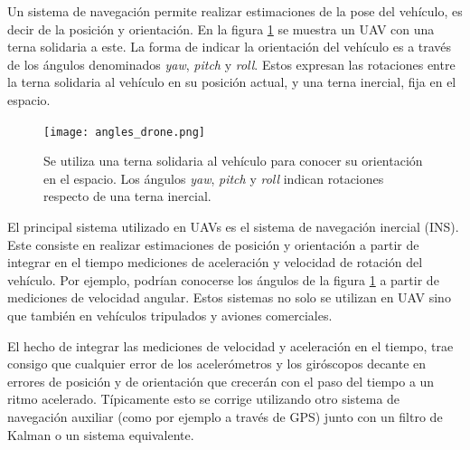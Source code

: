 
Un sistema de navegación permite realizar estimaciones de la pose del vehículo, es decir de la posición y orientación. En la figura \ref{fig:angles_drone} se muestra un UAV con una terna solidaria a este. La forma de indicar la orientación del vehículo es a través de los ángulos denominados \textit{yaw}, \textit{pitch} y \textit{roll}. Estos expresan las rotaciones entre la terna solidaria al vehículo en su posición actual, y una terna inercial, fija en el espacio.

\begin{figure}[H]
    \centering
    \texttt{[image: angles\_drone.png]}
    \caption{Se utiliza una terna solidaria al vehículo para conocer su orientación en el espacio. Los ángulos \textit{yaw}, \textit{pitch} y \textit{roll} indican rotaciones respecto de una terna inercial.}
    \label{fig:angles_drone}    
\end{figure}

El principal sistema utilizado en UAVs es el sistema de navegación inercial (INS). Este consiste en realizar estimaciones de posición y orientación a partir de integrar en el tiempo mediciones de aceleración y velocidad de rotación del vehículo. Por ejemplo, podrían conocerse los ángulos de la figura \ref{fig:angles_drone} a partir de mediciones de velocidad angular. Estos sistemas no solo se utilizan en UAV sino que también en vehículos tripulados y aviones comerciales.

El hecho de integrar las mediciones de velocidad y aceleración en el tiempo, trae consigo que cualquier error de los acelerómetros y los giróscopos decante en errores de posición y de orientación que crecerán con el paso del tiempo a un ritmo acelerado. Típicamente esto se corrige utilizando otro sistema de navegación auxiliar (como por ejemplo a través de GPS) junto con un filtro de Kalman o un sistema equivalente. %

